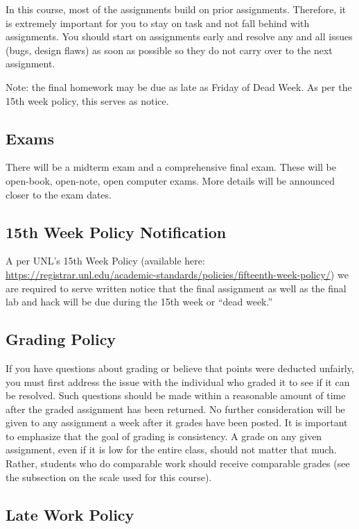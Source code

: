 \documentclass[12pt]{scrartcl}
\begin{document}
In this course, most of the assignments build on prior assignments.  
Therefore, it is extremely important for you to stay on task and not 
fall behind with assignments.  You should start on assignments early 
and resolve any and all issues (bugs, design flaws) as soon as 
possible so they do not carry over to the next assignment.

Note: the final homework may be due as late as Friday of Dead Week.  
As per the 15th week policy, this serves as notice.

\subsection{Exams}

There will be a midterm exam and a comprehensive final exam.  These
will be open-book, open-note, open computer exams.  More details will 
be announced closer to the exam dates.

\subsection{15th Week Policy Notification}
\label{subsection:deadweek}

A per UNL's 15th Week Policy (available here: \url{https://registrar.unl.edu/academic-standards/policies/fifteenth-week-policy/}) we are required
to serve written notice that the final assignment
as well as the final lab and hack will be due during the 15th 
week or ``dead week.''

\subsection{Grading Policy}

If you have questions about grading or believe that points were 
deducted unfairly, you must first address the issue with the 
individual who graded it to see if it can be resolved.  Such 
questions should be made within a reasonable amount of time 
after the graded assignment has been returned.  No further 
consideration will be given to any assignment a week after 
it grades have been posted.  It is important to emphasize that 
the goal of grading is consistency.  A grade on any given 
assignment, even if it is low for the entire class, should 
not matter that much.  Rather, students who do comparable 
work should receive comparable grades (see the subsection 
on the scale used for this course).

\subsection{Late Work Policy}
\end{document}
